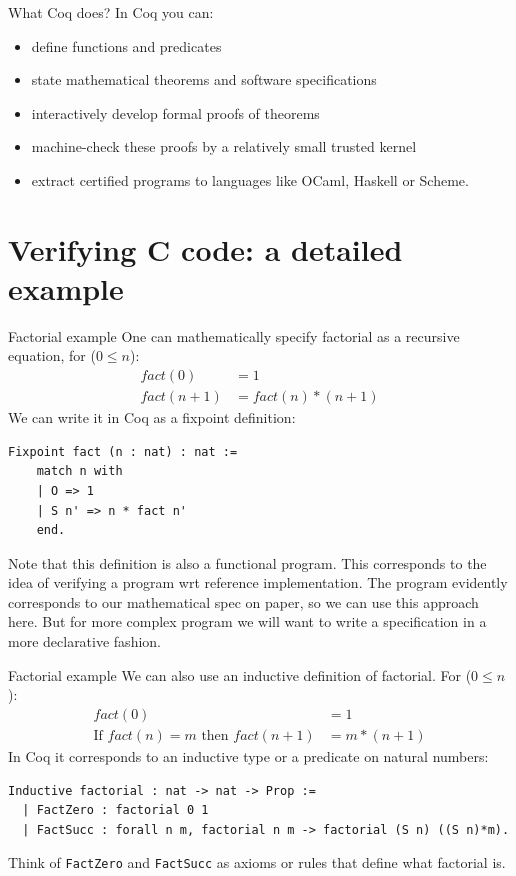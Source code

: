 \documentclass[10pt,usenames,dvipsnames,landscape]{beamer}
\begin{document}
\begin{frame}{What Coq does?}
  In Coq you can:
  \begin{itemize}
  
    \item define functions and predicates
    \item state mathematical theorems and software specifications
    \item interactively develop formal proofs of theorems
    \item machine-check these proofs by a relatively small trusted kernel
    \item extract certified programs to languages like OCaml, Haskell or Scheme.
  \end{itemize}
  
\end{frame}



\section{Verifying C code: a detailed example}

\begin{frame}[fragile]{Factorial example}
  One can mathematically specify factorial as a recursive equation, for ($0 \leq n$):\begin{align*}
  fact(0) &= 1 \\
  fact(n + 1) &= fact(n)*(n+1)    
  \end{align*}
  We can write it in Coq as a fixpoint definition:
  \begin{lstlisting}[language=Coq]
  Fixpoint fact (n : nat) : nat :=
    match n with
    | O => 1
    | S n' => n * fact n'
    end.
  \end{lstlisting}
  Note that this definition is also a functional program. This corresponds to the idea of verifying a program wrt reference implementation. The program evidently corresponds to our mathematical spec on paper, so we can use this approach here. But for more complex program we will want to write a specification in a more declarative fashion.
 
\end{frame}

\begin{frame}[fragile]{Factorial example}
  We can also use an inductive definition of factorial. 
  For ($0 \leq n$):\begin{align}
  fact(0) &= 1 \\
  \text{If } fact(n) = m \text{ then } fact(n + 1) &= m*(n+1)    
  \end{align}
  In Coq it corresponds to an inductive type or a predicate on natural numbers:
  \begin{lstlisting}[language=Coq]
  Inductive factorial : nat -> nat -> Prop :=
  | FactZero : factorial 0 1
  | FactSucc : forall n m, factorial n m -> factorial (S n) ((S n)*m).   
  \end{lstlisting}
Think of \texttt{FactZero} and \texttt{FactSucc} as axioms or rules that define what factorial is.

\end{frame}
\end{document}
